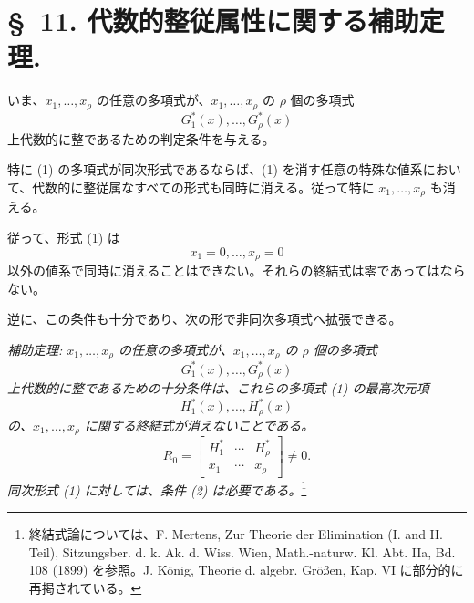 \documentclass[11pt]{jlreq}
\begin{document}
\section*{\S\ 11. 代数的整従属性に関する補助定理.}

いま、$x_1,\ldots,x_\rho$ の任意の多項式が、$x_1,\ldots,x_\rho$ の $\rho$ 個の多項式
\begin{equation}
  G_1^*(x),\ldots,G_\rho^*(x)
\tag{1}
\end{equation}
上代数的に整であるための判定条件を与える。

特に (1) の多項式が同次形式であるならば、(1) を消す任意の特殊な値系において、代数的に整従属なすべての形式も同時に消える。従って特に $x_1,\ldots,x_\rho$ も消える。

従って、形式 (1) は
\[
  x_1=0,
  \ldots,
  x_\rho=0
\]
以外の値系で同時に消えることはできない。それらの終結式は零であってはならない。

逆に、この条件も十分であり、次の形で非同次多項式へ拡張できる。

\emph{補助定理: $x_1,\ldots,x_\rho$ の任意の多項式が、$x_1,\ldots,x_\rho$ の $\rho$ 個の多項式}
\[
  G_1^*(x),\ldots,G_\rho^*(x)
\]
\emph{上代数的に整であるための十分条件は、これらの多項式 (1) の最高次元項}
\[
  H_1^*(x),\ldots,H_\rho^*(x)
\]
\emph{の、$x_1,\ldots,x_\rho$ に関する終結式が消えないことである。}
\begin{equation}
  R_0=\left[
  \begin{array}{ccc}
    H_1^*&\cdots&H_\rho^*\\
    x_1&\cdots&x_\rho
  \end{array}
  \right]\ne0.
\tag{2}
\end{equation}
\emph{同次形式 (1) に対しては、条件 (2) は必要である。}\footnote{終結式論については、F. Mertens, Zur Theorie der Elimination (I. and II. Teil), Sitzungsber. d. k. Ak. d. Wiss. Wien, Math.-naturw. Kl. Abt. IIa, Bd. 108 (1899) を参照。J. König, Theorie d. algebr. Größen, Kap. VI に部分的に再掲されている。}
\end{document}
